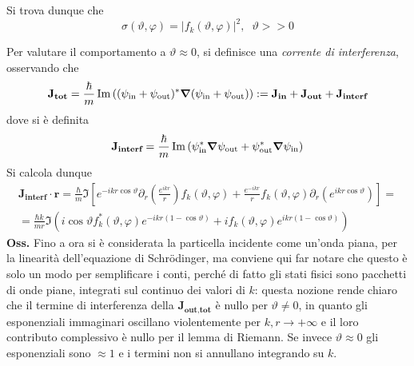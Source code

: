 Si trova dunque che
$$\boxed{\sigma(\vartheta,\varphi) = \left|f_k(\vartheta,\varphi)\right|^2,\phantom{x}\vartheta>>0}$$

Per valutare il comportamento a $\vartheta\approx0$, si definisce una \textit
{corrente di interferenza}, osservando che
$$\mathbf{J_\textbf{tot}} = \frac{\hbar}{m}\Im\left((\psi_\text{in}+\psi_\text{out})^*\gradient
(\psi_\text{in}+\psi_\text{out})\right):= \mathbf{J_\textbf{in}}+\mathbf{J_\textbf{out}}+
\mathbf{J_\textbf{interf}}$$
dove si è definita
$$\mathbf{J_\textbf{interf}} = \frac{\hbar}{m}\Im\left(\psi_\text{in}^*\gradient\psi_\text{out} +
\psi_\text{out}^*\gradient\psi_\text{in}\right)$$
Si calcola dunque
\begin{gather*}
\mathbf{J_\textbf{interf}}\cdot\mathbf{\hat r} = \frac{\hbar}{m}
\Im\left[e^{-ikr\cos\vartheta}\partial_r\left(\frac{e^{ikr}}{r}\right)f_k(\vartheta,\varphi)
+\frac{e^{-ikr}}{r}f_k(\vartheta,\varphi)\partial_r\left(e^{ikr\cos\vartheta}\right)\right]=\\
= \frac{\hbar k}{mr}\Im\left(i\cos\vartheta f_k^*(\vartheta,\varphi)e^{-ikr(1-\cos\vartheta)}+
    if_k(\vartheta,\varphi)e^{ikr(1-\cos\vartheta)}
\right)
\end{gather*}
\textbf{Oss.} Fino a ora si è considerata la particella incidente come un'onda piana, per
la linearità dell'equazione di Schrödinger, ma conviene qui far notare che questo è solo un modo per
semplificare i conti, perché di fatto gli stati fisici sono pacchetti di onde piane, integrati sul
continuo dei valori di $k$: questa nozione rende chiaro che il termine di interferenza della
$\mathbf{J_\textbf{out,tot}}$ è nullo per $\vartheta \not=0$, in quanto gli esponenziali immaginari
oscillano violentemente per $k,r\to+\infty$ e il loro contributo complessivo è nullo per il lemma di
Riemann. Se invece $\vartheta\approx 0 $ gli esponenziali sono $\approx1$ e i termini non
si annullano integrando su $k$.

